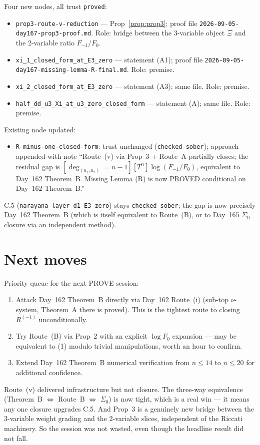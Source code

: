 \documentclass[11pt]{amsart}
\newcommand{\Rminus}{R^{(-1)}}
\newcommand{\deghom}[1]{[\deg_{(u_1,u_2)} = #1]}
\begin{document}
Four new nodes, all trust \texttt{proved}:
\begin{itemize}[leftmargin=1.5em]
    \item \texttt{prop3-route-v-reduction} --- Prop~\ref{prop:prop3}; proof file
    \texttt{2026-09-05-day167-prop3-proof.md}. Role: bridge between the
    3-variable object $\Xi$ and the 2-variable ratio $F_{-1}/F_0$.
    \item \texttt{xi\_1\_closed\_form\_at\_E3\_zero} --- statement (A1); proof file
    \texttt{2026-09-05-day167-missing-lemma-R-final.md}. Role: premise.
    \item \texttt{xi\_2\_closed\_form\_at\_E3\_zero} --- statement (A3); same file.
    Role: premise.
    \item \texttt{half\_dd\_u3\_Xi\_at\_u3\_zero\_closed\_form} --- statement (A); same file.
    Role: premise.
\end{itemize}

Existing node updated:
\begin{itemize}[leftmargin=1.5em]
    \item \texttt{R-minus-one-closed-form}: trust unchanged
    (\texttt{checked-sober}); approach appended with note ``Route~(v) via
    Prop~3 + Route~A partially closes; the residual gap is
    $\deghom{n-1}[T^n]\log(F_{-1}/F_0)$, equivalent to Day~162 Theorem~B.
    Missing Lemma (R) is now PROVED conditional on Day~162 Theorem~B.''
\end{itemize}

C.5 (\texttt{narayana-layer-d1-E3-zero}) stays \texttt{checked-sober};
the gap is now precisely Day~162 Theorem~B (which is itself equivalent
to Route~(B), or to Day~165 $\Sigma_0$ closure via an independent method).

\section*{Next moves}

Priority queue for the next PROVE session:
\begin{enumerate}[leftmargin=2em, label=\arabic*.]
    \item Attack Day~162 Theorem~B directly via Day~162 Route~(i) (sub-top
    $\nu$-system, Theorem~A there is proved). This is the tightest route
    to closing $\Rminus$ unconditionally.
    \item Try Route~(B) via Prop~2 with an explicit $\log F_0$ expansion
    --- may be equivalent to (1) modulo trivial manipulations, worth an
    hour to confirm.
    \item Extend Day~162 Theorem~B numerical verification from $n \le 14$
    to $n \le 20$ for additional confidence.
\end{enumerate}

Route~(v) delivered infrastructure but not closure. The three-way equivalence
(Theorem~B $\Leftrightarrow$ Route~B $\Leftrightarrow$ $\Sigma_0$) is now
tight, which is a real win --- it means any one closure upgrades C.5. And
Prop~3 is a genuinely new bridge between the 3-variable weight grading and
the 2-variable slices, independent of the Riccati machinery. So the session
was not wasted, even though the headline result did not fall.
\end{document}
